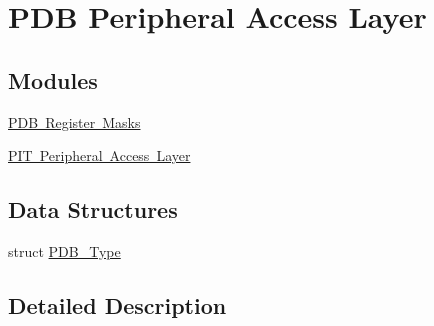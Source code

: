 \hypertarget{group___p_d_b___peripheral___access___layer}{}\section{P\+DB Peripheral Access Layer}
\label{group___p_d_b___peripheral___access___layer}
\subsection*{Modules}
\begin{DoxyCompactItemize}
\item 
\mbox{\hyperlink{group___p_d_b___register___masks}{P\+D\+B Register Masks}}
\item 
\mbox{\hyperlink{group___p_i_t___peripheral___access___layer}{P\+I\+T Peripheral Access Layer}}
\end{DoxyCompactItemize}
\subsection*{Data Structures}
\begin{DoxyCompactItemize}
\item 
struct \mbox{\hyperlink{struct_p_d_b___type}{P\+D\+B\+\_\+\+Type}}
\end{DoxyCompactItemize}


\subsection{Detailed Description}
